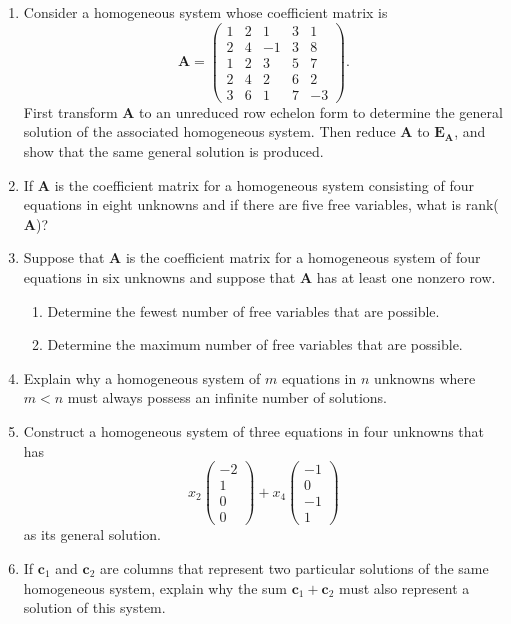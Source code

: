 \begin{enumerate}[leftmargin=*, label=\bfseries 2.4.\arabic*]
\item Consider a homogeneous system whose coefficient matrix is
\[
\mathbf{A} = \left(\begin{array}{ccccc}
    1 & 2 & 1 & 3 & 1 \\
    2 & 4 & -1 & 3 & 8 \\
    1 & 2 & 3 & 5 & 7 \\
    2 & 4 & 2 & 6 & 2 \\
    3 & 6 & 1 & 7 & -3
\end{array}\right).
\]
First transform \(\mathbf{A}\) to an unreduced row echelon form to determine the
general solution of the associated homogeneous system. Then reduce \(\mathbf{A}\)
to \(\mathbf{E_A}\), and show that the same general solution is produced.

\item If \(\mathbf{A}\) is the coefficient matrix for a homogeneous system consisting of four equations in eight unknowns and if there are five free variables, what is rank(\(\mathbf{A}\))?

\item Suppose that \(\mathbf{A}\) is the coefficient matrix for a homogeneous system of four equations in six unknowns and suppose that \(\mathbf{A}\) has at least one nonzero row.
\begin{enumerate}[label=(\alph*)]
    \item Determine the fewest number of free variables that are possible.
    \item Determine the maximum number of free variables that are possible.
\end{enumerate}

\item Explain why a homogeneous system of \(m\) equations in \(n\) unknowns where \(m < n\) must always possess an infinite number of solutions.

\item Construct a homogeneous system of three equations in four unknowns that has
\[
x_2\left(\begin{array}{c}
    -2 \\
    1 \\
    0 \\
    0
\end{array}\right)+
x_4\left(\begin{array}{c}
    -1 \\
    0 \\
    -1 \\
    1
\end{array}\right)
\]
as its general solution.

\item If \(\mathbf{c}_1\) and \(\mathbf{c}_2\) are columns that represent two particular solutions of the same homogeneous system, explain why the sum \(\mathbf{c}_1 + \mathbf{c}_2\) must also represent a solution of this system.

\end{enumerate}
